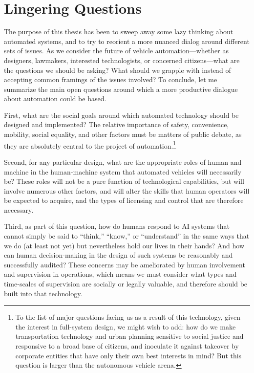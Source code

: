 \section{Lingering Questions}

The purpose of this thesis has been to sweep away some lazy thinking
about automated systems, and to try to reorient a more nuanced dialog
around different sets of issues. As we consider the future of
vehicle automation---whether as
designers, lawmakers, interested technologists, or concerned
citizens---what are the questions we should be asking? What should we
grapple with instead of accepting common framings of the issues
involved? To conclude, let me summarize the main open questions around
which a more productive dialogue about automation could be based.

First, what are the social goals around which automated technology
should be designed and implemented? The relative importance of safety,
convenience, mobility, social equality, and other factors must be
matters of public debate, as they are absolutely central to the
project of automation.\footnote{To the list
of major questions facing us as a result of this technology, given the
interest in full-system design, we might
wish to
add: how do we make transportation technology and urban planning sensitive to social
justice and responsive to a broad base of citizens, and inoculate it
against takeover by corporate entities that have only their own best interests
in mind? But this question is larger than the autonomous vehicle arena.}

Second, for any particular design, what are the appropriate roles of
human and machine in the human-machine system that automated vehicles
will necessarily be? These roles will not be a pure function of
technological capabilities, but will involve numerous other factors,
and will alter the skills that human operators will be expected to
acquire, and the types of licensing and control that are therefore
necessary. 

Third, as part of this question, how do humans
respond to AI systems that cannot simply be said to
``think,'' ``know,'' or ``understand'' in the same ways that we do (at
least not yet) but nevertheless hold our lives in their hands?
And how can human decision-making in the design of such systems be
reasonably and successfully audited?
These concerns may be ameliorated by human involvement and
supervision in operations, which means we must consider what types and
time-scales of supervision are socially or legally valuable, and
therefore should be built into that technology. 


